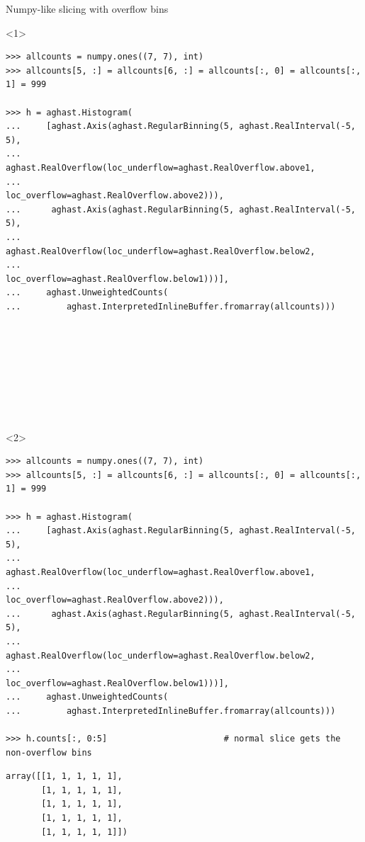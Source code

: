 \documentclass[aspectratio=169]{beamer}
\begin{document}
\begin{frame}[fragile]{Numpy-like slicing with overflow bins}
\scriptsize
\vspace{0.4 cm}
\begin{onlyenv}<1>
\begin{verbatim}
>>> allcounts = numpy.ones((7, 7), int)
>>> allcounts[5, :] = allcounts[6, :] = allcounts[:, 0] = allcounts[:, 1] = 999

>>> h = aghast.Histogram(
...     [aghast.Axis(aghast.RegularBinning(5, aghast.RealInterval(-5, 5),
...                  aghast.RealOverflow(loc_underflow=aghast.RealOverflow.above1,
...                                      loc_overflow=aghast.RealOverflow.above2))),
...      aghast.Axis(aghast.RegularBinning(5, aghast.RealInterval(-5, 5),
...                  aghast.RealOverflow(loc_underflow=aghast.RealOverflow.below2,
...                                      loc_overflow=aghast.RealOverflow.below1)))],
...     aghast.UnweightedCounts(
...         aghast.InterpretedInlineBuffer.fromarray(allcounts)))


\end{verbatim}
\begin{verbatim}







\end{verbatim}
\end{onlyenv}
\begin{onlyenv}<2>
\begin{verbatim}
>>> allcounts = numpy.ones((7, 7), int)
>>> allcounts[5, :] = allcounts[6, :] = allcounts[:, 0] = allcounts[:, 1] = 999

>>> h = aghast.Histogram(
...     [aghast.Axis(aghast.RegularBinning(5, aghast.RealInterval(-5, 5),
...                  aghast.RealOverflow(loc_underflow=aghast.RealOverflow.above1,
...                                      loc_overflow=aghast.RealOverflow.above2))),
...      aghast.Axis(aghast.RegularBinning(5, aghast.RealInterval(-5, 5),
...                  aghast.RealOverflow(loc_underflow=aghast.RealOverflow.below2,
...                                      loc_overflow=aghast.RealOverflow.below1)))],
...     aghast.UnweightedCounts(
...         aghast.InterpretedInlineBuffer.fromarray(allcounts)))

>>> h.counts[:, 0:5]                       # normal slice gets the non-overflow bins
\end{verbatim}
\begin{verbatim}
array([[1, 1, 1, 1, 1],
       [1, 1, 1, 1, 1],
       [1, 1, 1, 1, 1],
       [1, 1, 1, 1, 1],
       [1, 1, 1, 1, 1]])



\end{verbatim}
\end{onlyenv}
\end{frame}
\end{document}
